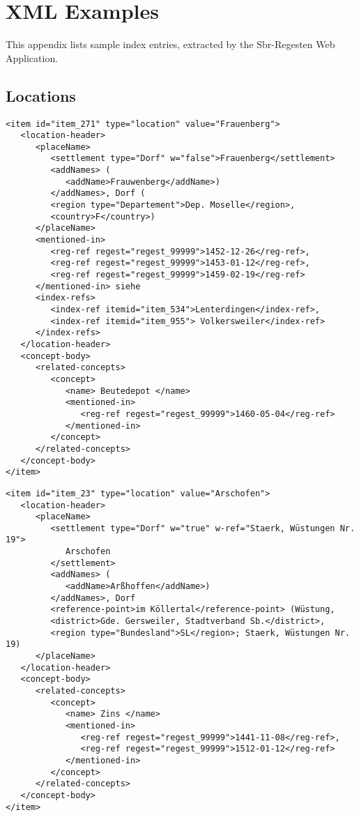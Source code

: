 \section{XML Examples}
\label{sec:examples}

This appendix lists sample index entries, extracted by the
Sbr-Regesten Web Application.

\subsection{Locations}
\label{sec:loc-examples}

\begin{verbatim}
<item id="item_271" type="location" value="Frauenberg">
   <location-header>
      <placeName>
         <settlement type="Dorf" w="false">Frauenberg</settlement>
         <addNames> (
            <addName>Frauwenberg</addName>)
         </addNames>, Dorf (
         <region type="Departement">Dep. Moselle</region>,
         <country>F</country>)
      </placeName>
      <mentioned-in>
         <reg-ref regest="regest_99999">1452-12-26</reg-ref>,
         <reg-ref regest="regest_99999">1453-01-12</reg-ref>,
         <reg-ref regest="regest_99999">1459-02-19</reg-ref>
      </mentioned-in> siehe
      <index-refs>
         <index-ref itemid="item_534">Lenterdingen</index-ref>,
         <index-ref itemid="item_955"> Volkersweiler</index-ref>
      </index-refs>
   </location-header>
   <concept-body>
      <related-concepts>
         <concept>
            <name> Beutedepot </name>
            <mentioned-in>
               <reg-ref regest="regest_99999">1460-05-04</reg-ref>
            </mentioned-in>
         </concept>
      </related-concepts>
   </concept-body>
</item>
\end{verbatim}

\begin{verbatim}
<item id="item_23" type="location" value="Arschofen">
   <location-header>
      <placeName>
         <settlement type="Dorf" w="true" w-ref="Staerk, Wüstungen Nr. 19">
            Arschofen
         </settlement>
         <addNames> (
            <addName>Arßhoffen</addName>)
         </addNames>, Dorf
         <reference-point>im Köllertal</reference-point> (Wüstung,
         <district>Gde. Gersweiler, Stadtverband Sb.</district>,
         <region type="Bundesland">SL</region>; Staerk, Wüstungen Nr. 19)
      </placeName>
   </location-header>
   <concept-body>
      <related-concepts>
         <concept>
            <name> Zins </name>
            <mentioned-in>
               <reg-ref regest="regest_99999">1441-11-08</reg-ref>,
               <reg-ref regest="regest_99999">1512-01-12</reg-ref>
            </mentioned-in>
         </concept>
      </related-concepts>
   </concept-body>
</item>
\end{verbatim}

